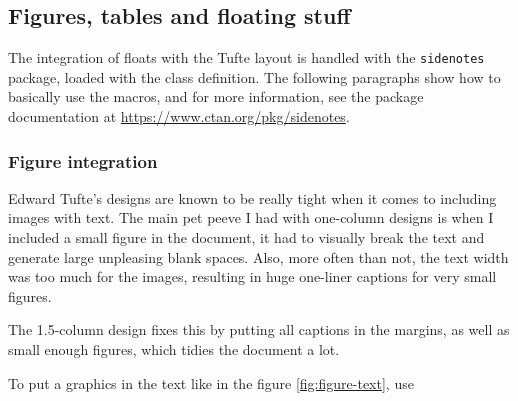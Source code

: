 \documentclass[
	raggedright,
	12pt,
	colorful,
]{tufte-style-article}
\begin{document}
\subsection{Figures, tables and floating stuff}

The integration of floats with the Tufte layout is handled with the \texttt{sidenotes} package, loaded with the class definition. The following paragraphs show how to basically use the macros, and for more information, see the package documentation at \url{https://www.ctan.org/pkg/sidenotes}.

\subsubsection{Figure integration}

Edward Tufte's designs are known to be really tight when it comes to including images with text. The main pet peeve I had with one-column designs is when I included a small figure in the document, it had to visually break the text and generate large unpleasing blank spaces. Also, more often than not, the text width was too much for the images, resulting in huge one-liner captions for very small figures.

The 1.5-column design fixes this by putting all captions in the margins, as well as small enough figures, which tidies the document a lot.




To put a graphics in the text like in the figure \ref{fig:figure-text}, use
\end{document}
